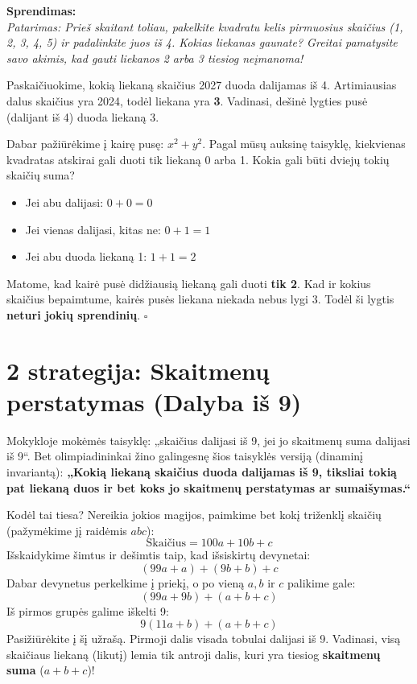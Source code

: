 \documentclass[11pt,a4paper]{scrartcl}
\newenvironment{solution}
    {\begin{list}{}{\setlength{\leftmargin}{10pt}\setlength{\rightmargin}{10pt}}\item[]}
    {\end{list}}
\begin{document}
\begin{solution}
\textbf{Sprendimas:} \\
\textit{Patarimas: Prieš skaitant toliau, pakelkite kvadratu kelis pirmuosius skaičius (1, 2, 3, 4, 5) ir padalinkite juos iš 4. Kokias liekanas gaunate? Greitai pamatysite savo akimis, kad gauti liekanos 2 arba 3 tiesiog neįmanoma!}

Paskaičiuokime, kokią liekaną skaičius 2027 duoda dalijamas iš 4. Artimiausias dalus skaičius yra 2024, todėl liekana yra \textbf{3}. Vadinasi, dešinė lygties pusė (dalijant iš 4) duoda liekaną 3.

Dabar pažiūrėkime į kairę pusę: $x^2 + y^2$. Pagal mūsų auksinę taisyklę, kiekvienas kvadratas atskirai gali duoti tik liekaną 0 arba 1. Kokia gali būti dviejų tokių skaičių suma?
\begin{itemize}
    \item Jei abu dalijasi: $0 + 0 = 0$
    \item Jei vienas dalijasi, kitas ne: $0 + 1 = 1$
    \item Jei abu duoda liekaną 1: $1 + 1 = 2$
\end{itemize}
Matome, kad kairė pusė didžiausią liekaną gali duoti \textbf{tik 2}. Kad ir kokius skaičius bepaimtume, kairės pusės liekana niekada nebus lygi 3. Todėl ši lygtis \textbf{neturi jokių sprendinių}. \hfill $\square$
\end{solution}

\section{2 strategija: Skaitmenų perstatymas (Dalyba iš 9)}

Mokykloje mokėmės taisyklę: „skaičius dalijasi iš 9, jei jo skaitmenų suma dalijasi iš 9“. Bet olimpiadininkai žino galingesnę šios taisyklės versiją (dinaminį invariantą):
\textbf{„Kokią liekaną skaičius duoda dalijamas iš 9, tiksliai tokią pat liekaną duos ir bet koks jo skaitmenų perstatymas ar sumaišymas.“}

Kodėl tai tiesa? Nereikia jokios magijos, paimkime bet kokį triženklį skaičių (pažymėkime jį raidėmis $abc$):
\[ \text{Skaičius} = 100a + 10b + c \]
Išskaidykime šimtus ir dešimtis taip, kad išsiskirtų devynetai:
\[ (99a + a) + (9b + b) + c \]
Dabar devynetus perkelkime į priekį, o po vieną $a, b$ ir $c$ palikime gale:
\[ (99a + 9b) + (a + b + c) \]
Iš pirmos grupės galime iškelti 9:
\[ 9(11a + b) + (a + b + c) \]
Pasižiūrėkite į šį užrašą. Pirmoji dalis visada tobulai dalijasi iš 9. Vadinasi, visą skaičiaus liekaną (likutį) lemia tik antroji dalis, kuri yra tiesiog \textbf{skaitmenų suma} ($a+b+c$)!
\end{document}

